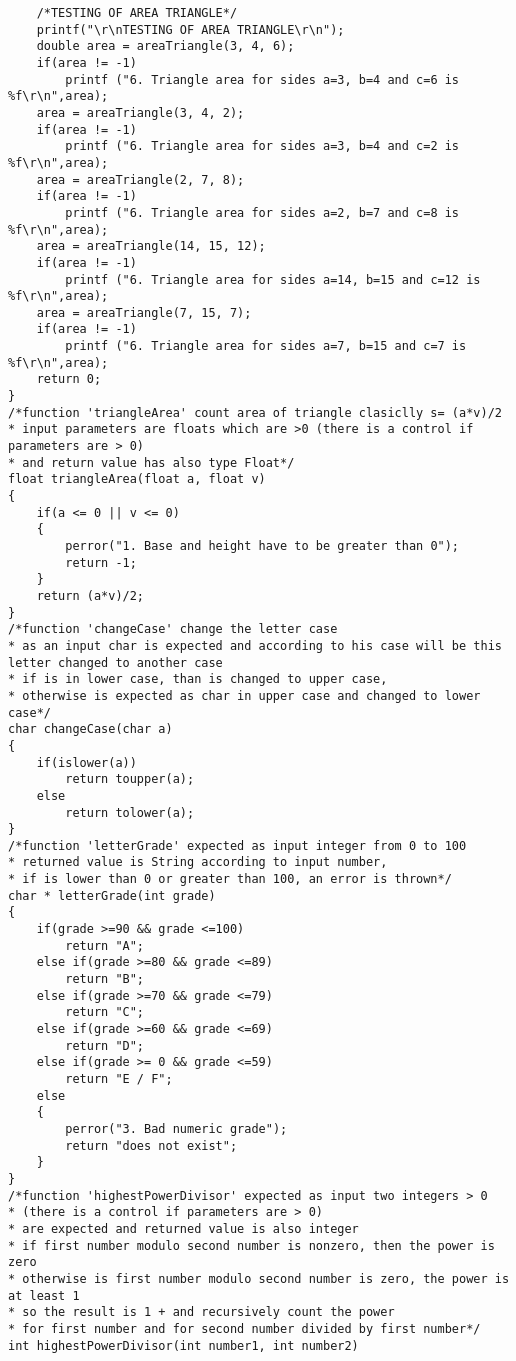 \documentclass[4pt]{article}
\begin{document}
\begin{verbatim}
    /*TESTING OF AREA TRIANGLE*/
    printf("\r\nTESTING OF AREA TRIANGLE\r\n");
    double area = areaTriangle(3, 4, 6);
    if(area != -1)
        printf ("6. Triangle area for sides a=3, b=4 and c=6 is %f\r\n",area);
    area = areaTriangle(3, 4, 2);
    if(area != -1)
        printf ("6. Triangle area for sides a=3, b=4 and c=2 is %f\r\n",area);
    area = areaTriangle(2, 7, 8);
    if(area != -1)
        printf ("6. Triangle area for sides a=2, b=7 and c=8 is %f\r\n",area);
    area = areaTriangle(14, 15, 12);
    if(area != -1)
        printf ("6. Triangle area for sides a=14, b=15 and c=12 is %f\r\n",area);
    area = areaTriangle(7, 15, 7);
    if(area != -1)
        printf ("6. Triangle area for sides a=7, b=15 and c=7 is %f\r\n",area);
    return 0;
}
/*function 'triangleArea' count area of triangle clasiclly s= (a*v)/2
* input parameters are floats which are >0 (there is a control if parameters are > 0)
* and return value has also type Float*/
float triangleArea(float a, float v)
{
    if(a <= 0 || v <= 0) 
    {
        perror("1. Base and height have to be greater than 0");
        return -1;
    }
    return (a*v)/2;
}
/*function 'changeCase' change the letter case
* as an input char is expected and according to his case will be this letter changed to another case
* if is in lower case, than is changed to upper case,
* otherwise is expected as char in upper case and changed to lower case*/
char changeCase(char a)
{
    if(islower(a))
        return toupper(a);
    else
        return tolower(a);
}
/*function 'letterGrade' expected as input integer from 0 to 100
* returned value is String according to input number,
* if is lower than 0 or greater than 100, an error is thrown*/
char * letterGrade(int grade)
{
    if(grade >=90 && grade <=100)
        return "A";
    else if(grade >=80 && grade <=89)
        return "B";
    else if(grade >=70 && grade <=79)
        return "C";
    else if(grade >=60 && grade <=69)
        return "D";
    else if(grade >= 0 && grade <=59)
        return "E / F";
    else
    {
        perror("3. Bad numeric grade");
        return "does not exist";
    }
}
/*function 'highestPowerDivisor' expected as input two integers > 0
* (there is a control if parameters are > 0)
* are expected and returned value is also integer
* if first number modulo second number is nonzero, then the power is zero
* otherwise is first number modulo second number is zero, the power is at least 1
* so the result is 1 + and recursively count the power
* for first number and for second number divided by first number*/
int highestPowerDivisor(int number1, int number2)

\end{verbatim}
\end{document}
